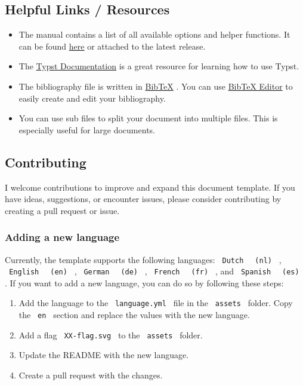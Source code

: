 \subsection{Helpful Links / Resources}\label{helpful-links-resources}

\begin{itemize}
\tightlist
\item
  The manual contains a list of all available options and helper
  functions. It can be found
  \href{https://github.com/TomVer99/FHICT-typst-template/blob/main/documentation/manual.pdf}{here}
  or attached to the latest release.
\item
  The \href{https://typst.app/docs/}{Typst Documentation} is a great
  resource for learning how to use Typst.
\item
  The bibliography file is written in
  \href{http://www.bibtex.org/Format/}{BibTeX} . You can use
  \href{https://truben.no/latex/bibtex/}{BibTeX Editor} to easily create
  and edit your bibliography.
\item
  You can use sub files to split your document into multiple files. This
  is especially useful for large documents.
\end{itemize}

\subsection{Contributing}\label{contributing}

I welcome contributions to improve and expand this document template. If
you have ideas, suggestions, or encounter issues, please consider
contributing by creating a pull request or issue.

\subsubsection{Adding a new language}\label{adding-a-new-language}

Currently, the template supports the following languages:
\texttt{\ Dutch\ } \texttt{\ (nl)\ } , \texttt{\ English\ }
\texttt{\ (en)\ } , \texttt{\ German\ } \texttt{\ (de)\ } ,
\texttt{\ French\ } \texttt{\ (fr)\ } , and \texttt{\ Spanish\ }
\texttt{\ (es)\ } . If you want to add a new language, you can do so by
following these steps:

\begin{enumerate}
\tightlist
\item
  Add the language to the \texttt{\ language.yml\ } file in the
  \texttt{\ assets\ } folder. Copy the \texttt{\ en\ } section and
  replace the values with the new language.
\item
  Add a flag \texttt{\ XX-flag.svg\ } to the \texttt{\ assets\ } folder.
\item
  Update the README with the new language.
\item
  Create a pull request with the changes.
\end{enumerate}


